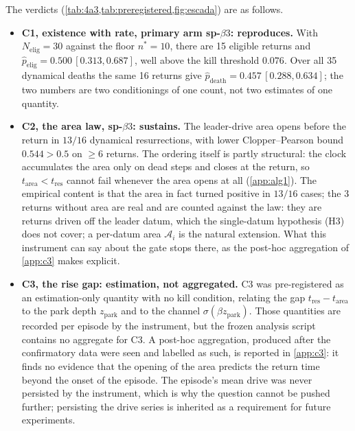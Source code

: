 \documentclass[11pt]{article}
\theoremstyle{definition}
\theoremstyle{remark}
\begin{document}
The verdicts (\cref{tab:4a3,tab:preregistered,fig:escada}) are as follows.

\begin{itemize}
\item \textbf{C1, existence with rate, primary arm sp-$\beta3$: reproduces.}
With $N_{\mathrm{elig}}=30$ against the floor $n^\ast=10$, there are 15 eligible
returns and $\hat p_{\mathrm{elig}}=0.500\,[0.313,0.687]$, well above the kill
threshold $0.076$. Over all 35 dynamical deaths the same 16 returns give
$\hat p_{\mathrm{death}}=0.457\,[0.288,0.634]$; the two numbers are two
conditionings of one count, not two estimates of one quantity.

\item \textbf{C2, the area law, sp-$\beta3$: sustains.} The leader-drive area
opens before the return in $13/16$ dynamical resurrections, with lower
Clopper--Pearson bound $0.544>0.5$ on $\ge6$ returns. The ordering itself is
partly structural: the clock accumulates the area only on dead steps and closes
at the return, so $t_{\mathrm{area}}<t_{\mathrm{res}}$ cannot fail whenever the
area opens at all (\cref{app:alg1}). The empirical content is that the area in
fact turned positive in $13/16$ cases; the 3 returns without area are real and
are counted against the law: they are returns driven off the
leader datum, which the single-datum hypothesis (H3) does not cover; a
per-datum area $\mathcal A_i$ is the natural extension. What this instrument can
say about the gate stops there, as the post-hoc aggregation of
\cref{app:c3} makes explicit.

\item \textbf{C3, the rise gap: estimation, not aggregated.} C3 was
pre-registered as an estimation-only quantity with no kill condition, relating
the gap $t_{\mathrm{res}}-t_{\mathrm{area}}$ to the park depth
$z_{\mathrm{park}}$ and to the channel $\sigma(\beta z_{\mathrm{park}})$. Those
quantities are recorded per episode by the instrument, but the frozen analysis
script contains no aggregate for C3. A post-hoc aggregation, produced after the
confirmatory data were seen and labelled as such, is reported in
\cref{app:c3}: it finds no evidence that the opening of the area predicts the
return time beyond the onset of the episode. The episode's mean drive was never
persisted by the instrument, which is why the question cannot be pushed
further; persisting the drive series is inherited as a requirement for future
experiments.


\end{itemize}
\end{document}
